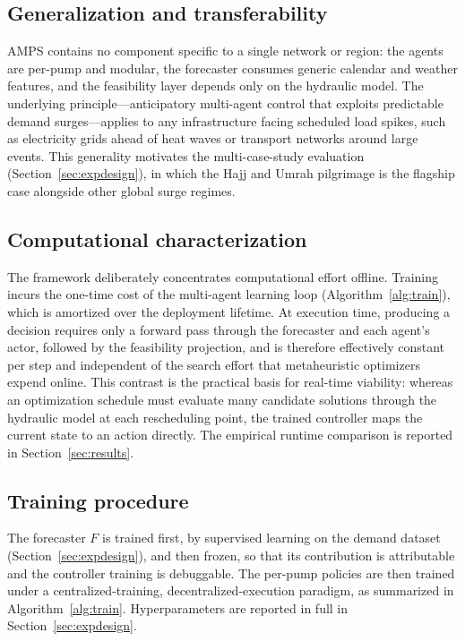 \documentclass[11pt,a4paper]{article}
\begin{document}
\subsection{Generalization and transferability}
AMPS contains no component specific to a single network or region: the agents are
per-pump and modular, the forecaster consumes generic calendar and weather
features, and the feasibility layer depends only on the hydraulic model. The
underlying principle---anticipatory multi-agent control that exploits predictable
demand surges---applies to any infrastructure facing scheduled load spikes, such
as electricity grids ahead of heat waves or transport networks around large
events. This generality motivates the multi-case-study evaluation
(Section~\ref{sec:expdesign}), in which the Hajj and Umrah pilgrimage is the
flagship case alongside other global surge regimes.

\subsection{Computational characterization}
The framework deliberately concentrates computational effort offline. Training
incurs the one-time cost of the multi-agent learning loop
(Algorithm~\ref{alg:train}), which is amortized over the deployment lifetime. At
execution time, producing a decision requires only a forward pass through the
forecaster and each agent's actor, followed by the feasibility projection, and is
therefore effectively constant per step and independent of the search effort that
metaheuristic optimizers expend online. This contrast is the practical basis for
real-time viability: whereas an optimization schedule must evaluate many
candidate solutions through the hydraulic model at each rescheduling point, the
trained controller maps the current state to an action directly. The empirical
runtime comparison is reported in Section~\ref{sec:results}.

\subsection{Training procedure}
The forecaster $F$ is trained first, by supervised learning on the demand dataset
(Section~\ref{sec:expdesign}), and then frozen, so that its contribution is
attributable and the controller training is debuggable. The per-pump policies are
then trained under a centralized-training, decentralized-execution paradigm, as
summarized in Algorithm~\ref{alg:train}. Hyperparameters are reported in full in
Section~\ref{sec:expdesign}.
\end{document}
